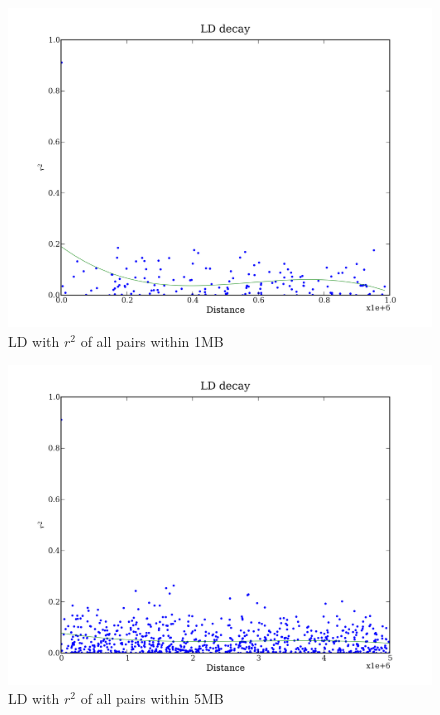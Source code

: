 \documentclass[a4paper,10pt]{article}
\begin{document}
\begin{figure}
\includegraphics[width=1\textwidth]{figures/data_d110_c0_5_LD_r2_1000000.png}
\caption{LD with $r^2$ of all pairs within 1MB}\label{fld_3}
\end{figure}

\begin{figure}
\includegraphics[width=1\textwidth]{figures/data_d110_c0_5_LD_r2_5000000.png}
\caption{LD with $r^2$ of all pairs within 5MB}\label{fld_4}
\end{figure}
\end{document}
